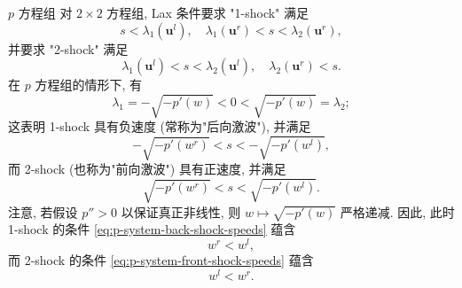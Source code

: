 \begin{Example}{$p$ 方程组}
\label{ex:p-system-lax-shock}
对 $2\times2$ 方程组, Lax 条件要求 "1-shock" 满足
\begin{equation}\label{eq:two-system-first-shock-condition}
s<\lambda_1(\bm{u}^l),\quad\lambda_1(\bm{u}^r)<s<\lambda_2(\bm{u}^r),
\end{equation}
并要求 "2-shock" 满足
\begin{equation}\label{eq:two-system-second-shock-condition}
\lambda_1(\bm{u}^l)<s<\lambda_2(\bm{u}^l),\quad\lambda_2(\bm{u}^r)<s.
\end{equation}
在 $p$ 方程组的情形下, 有
\begin{equation}\label{eq:p-system-eigenvalue-signs}
\lambda_1=-\sqrt{-p'(w)}<0<\sqrt{-p'(w)}=\lambda_2;
\end{equation}
这表明 1-shock 具有负速度 (常称为"后向激波"), 并满足
\begin{equation}\label{eq:p-system-back-shock-speeds}
-\sqrt{-p'(w^r)}<s<-\sqrt{-p'(w^l)},
\end{equation}
而 2-shock (也称为"前向激波") 具有正速度, 并满足
\begin{equation}\label{eq:p-system-front-shock-speeds}
\sqrt{-p'(w^r)}<s<\sqrt{-p'(w^l)}.
\end{equation}
注意, 若假设 $p''>0$ 以保证真正非线性, 则 $w\mapsto\sqrt{-p'(w)}$ 严格递减. 因此, 此时 1-shock 的条件 \eqref{eq:p-system-back-shock-speeds} 蕴含
\begin{equation}\label{eq:p-system-back-shock-volume-jump}
w^r<w^l,
\end{equation}
而 2-shock 的条件 \eqref{eq:p-system-front-shock-speeds} 蕴含
\begin{equation}\label{eq:p-system-front-shock-volume-jump}
w^l<w^r.
\end{equation}

\end{Example}
